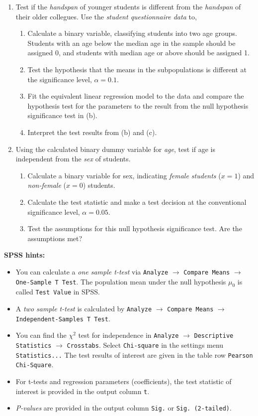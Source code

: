 \documentclass[a4paper, fleqn]{article}
\begin{document}
\begin{enumerate}
  \item Test if the \textit{handspan} of younger students is different from the \textit{handspan} of their older collegues. Use the \textit{student questionnaire data} to, 
    \begin{enumerate}
      \item Calculate a binary variable, classifying students into two age groups. Students with an age below the median age in the sample should be assigned 0, and students with median age or above should be assigned 1.
      \item Test the hypothesis that the means in the subpopulations is different at the significance level, $\alpha = 0.1$.
      \item Fit the equivalent linear regression model to the data and compare the hypothesis test for the parameters to the result from the null hypothesis significance test in (b). 
      \item Interpret the test results from (b) and (c). 
    \end{enumerate}

  \item Using the calculated binary dummy variable for \textit{age}, test if age is independent from the \textit{sex} of students.
    \begin{enumerate}
      \item Calculate a binary variable for sex, indicating \textit{female students} ($x = 1$) and \textit{non-female} ($x = 0$) students. 
      \item Calculate the test statistic and make a test decision at the conventional significance level, $\alpha = 0.05$.
      \item Test the assumptions for this null hypothesis significance test. Are the assumptions met?
    \end{enumerate}
\end{enumerate}

\newpage
\noindent
\textbf{SPSS hints:}
\begin{itemize}
  \item You can calculate a \textit{one sample t-test} via \texttt{Analyze} $\rightarrow$ \texttt{Compare Means} $\rightarrow$ \texttt{One-Sample T Test}. The population mean under the null hypothesis $\mu_0$ is called \texttt{Test Value} in SPSS. 
  \item A \textit{two sample t-test} is calculated by \texttt{Analyze} $\rightarrow$ \texttt{Compare Means} $\rightarrow$ \texttt{Independent-Samples T Test}. 
  \item You can find the $\chi^2$ test for independence in \texttt{Analyze} $\rightarrow$ \texttt{Descriptive Statistics} $\rightarrow$ \texttt{Crosstabs}. Select \texttt{Chi-square} in the settings menu \texttt{Statistics...} The test results of interest are given in the table row \texttt{Pearson Chi-Square}.
  \item For t-tests and regression parameters (coefficients), the test statistic of interest is provided in the output column \texttt{t}.
  \item \textit{P-values} are provided in the output column \texttt{Sig.} or \texttt{Sig. (2-tailed)}.
\end{itemize}
\end{document}
